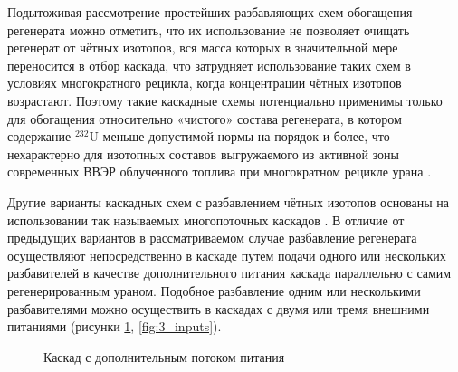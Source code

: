 Подытоживая рассмотрение простейших разбавляющих схем обогащения регенерата можно отметить, что их использование не позволяет очищать регенерат от чётных изотопов, вся масса которых в значительной мере переносится в отбор каскада, что затрудняет использование таких схем в условиях многократного рецикла, когда концентрации чётных изотопов возрастают. Поэтому такие каскадные схемы потенциально применимы только для обогащения относительно «чистого» состава регенерата, в котором содержание $^{232}$U меньше допустимой нормы на порядок и более, что нехарактерно для изотопных составов выгружаемого из активной зоны современных ВВЭР облученного топлива при многократном рецикле урана \cite{bormanTehnikoekonomicheskiyAnalizVozmozhnyh2012}. 

Другие варианты каскадных схем с разбавлением чётных изотопов основаны на использовании так называемых многопоточных каскадов \cite{sulaberidzeQuasiidealCascadesAdditional2006}. В отличие от предыдущих вариантов в рассматриваемом случае разбавление регенерата осуществляют непосредственно в каскаде путем подачи одного или нескольких разбавителей в качестве дополнительного питания каскада параллельно с самим регенерированным ураном. Подобное разбавление одним или несколькими разбавителями можно осуществить в каскадах с двумя или тремя внешними питаниями (рисунки \ref{fig:2_inputs}, \ref{fig:3_inputs}).

\begin{figure}[ht]
  \caption{Каскад с дополнительным потоком питания}\label{fig:2_inputs}
\end{figure}

